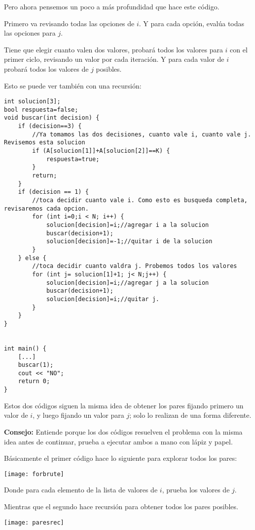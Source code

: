 Pero ahora pensemos un poco a más profundidad que hace este código.

Primero va revisando todas las opciones de \(i\). Y para cada opción, evalúa todas las opciones para \(j\). 

Tiene que elegir cuanto valen dos valores, probará todos los valores para \(i\) con el primer ciclo, revisando un valor por cada iteración. Y para cada valor de \(i\) probará todos los valores de \(j\) posibles.

Esto se puede ver también con una recursión:
\pagebreak

\begin{lstlisting}
int solucion[3];
bool respuesta=false;
void buscar(int decision) {
	if (decision==3) {
		//Ya tomamos las dos decisiones, cuanto vale i, cuanto vale j. Revisemos esta solucion
		if (A[solucion[1]]+A[solucion[2]]==K) {
			respuesta=true;
		}
		return;
	}
	if (decision == 1) {
		//toca decidir cuanto vale i. Como esto es busqueda completa, revisaremos cada opcion.
		for (int i=0;i < N; i++) {
			solucion[decision]=i;//agregar i a la solucion
			buscar(decision+1);	
			solucion[decision]=-1;//quitar i de la solucion
		}
	} else {
		//toca decidir cuanto valdra j. Probemos todos los valores
		for (int j= solucion[1]+1; j< N;j++) {				
			solucion[decision]=i;//agregar j a la solucion
			buscar(decision+1);
			solucion[decision]=i;//quitar j.
		}
	}
}


int main() {
	[...]
	buscar(1);
	cout << "NO";
	return 0;
}
\end{lstlisting}

Estos dos códigos siguen la misma idea de obtener los pares fijando primero un valor de \(i\), y  luego fijando un valor para \(j\); solo lo realizan de una forma diferente.

\textbf{Consejo:} Entiende porque los dos códigos resuelven el problema con la misma idea antes de continuar, prueba a ejecutar ambos a mano con lápiz y papel.

Básicamente el primer código hace lo siguiente para explorar todos los pares:
\begin{center}
	\texttt{[image: forbrute]}
\end{center}

Donde para cada elemento de la lista de valores de \(i\), prueba los valores de \(j\).

Mientras que el segundo hace recursión para obtener todos los pares posibles.

\begin{center}
	\texttt{[image: paresrec]}
\end{center}

